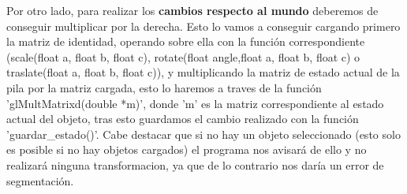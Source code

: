 \documentclass[12pt,a4paper]{article}
\begin{document}
\begin{enumerate}
Por otro lado, para realizar los \textbf{cambios respecto al mundo} deberemos de conseguir multiplicar por la derecha. Esto lo vamos a conseguir cargando primero la matriz de identidad, operando sobre ella con la función correspondiente (scale(float a, float b, float c), rotate(float angle,float a, float b, float c) o traslate(float a, float b, float c)), y multiplicando la matriz de estado actual de la pila por la matriz cargada, esto lo haremos a traves de la función 'glMultMatrixd(double *m)', donde 'm' es la matriz correspondiente al estado actual del objeto, tras esto guardamos el cambio realizado con la función 'guardar\_estado()'.\newline
Cabe destacar que si no hay un objeto seleccionado (esto solo es posible si no hay objetos cargados) el programa nos avisará de ello y no realizará ninguna transformacion, ya que de lo contrario nos daría un error de segmentación.\newline


\begin{lstlisting}


\end{lstlisting}
\end{enumerate}
\end{document}
